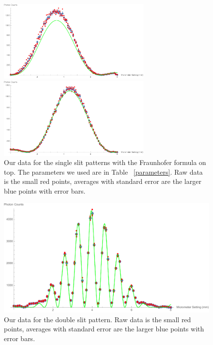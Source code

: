 \documentclass[prb,preprint]{revtex4-1}
\begin{document}
\begin{figure}[h!]
\centering
\begin{minipage}[b]{0.45\linewidth}
	\includegraphics[width=3in]{far_slit_Fraunhofer_plot.pdf}
\end{minipage}
\quad
\begin{minipage}[b]{0.45\linewidth}
	\includegraphics[width=3in]{near_slit_Fraunhofer_plot.pdf}
\end{minipage}
\caption{Our data for the single slit patterns with the Fraunhofer formula on top. The parameters we used are in Table ~\ref{parameters}. Raw data is the small red points, averages with standard error are the larger blue points with error bars. }
\label{single_slits_Fraunhofer_plot}
\end{figure}

\begin{figure}[h!]
\centering
\includegraphics[width=6in]{double_slit_Fraunhofer_plot.pdf}
\caption{Our data for the double slit pattern.  Raw data is the small red points, averages with standard error are the larger blue points with error bars. }
\label{double_slit_Fraunhofer_plot}
\end{figure}
\end{document}
